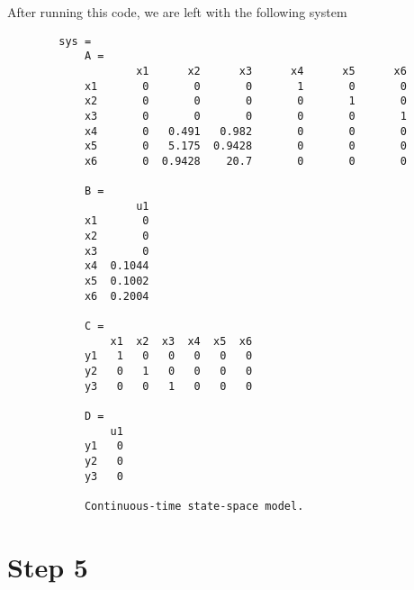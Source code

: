 \documentclass{article}
\theoremstyle{definition}
\begin{document}
    After running this code, we are left with the following system
    \begin{verbatim}
        sys =
            A = 
                    x1      x2      x3      x4      x5      x6
            x1       0       0       0       1       0       0
            x2       0       0       0       0       1       0
            x3       0       0       0       0       0       1
            x4       0   0.491   0.982       0       0       0
            x5       0   5.175  0.9428       0       0       0
            x6       0  0.9428    20.7       0       0       0
            
            B = 
                    u1
            x1       0
            x2       0
            x3       0
            x4  0.1044
            x5  0.1002
            x6  0.2004
            
            C = 
                x1  x2  x3  x4  x5  x6
            y1   1   0   0   0   0   0
            y2   0   1   0   0   0   0
            y3   0   0   1   0   0   0
            
            D = 
                u1
            y1   0
            y2   0
            y3   0
            
            Continuous-time state-space model.
    \end{verbatim}

    \section*{Step 5}
\end{document}
